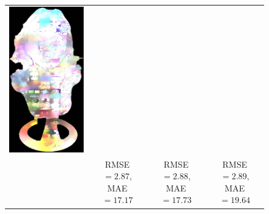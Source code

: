 \begin{figure}[H]
{\begin{tabular}{cccc}
\includegraphics[height=0.25\linewidth]{figures/result/comp_fusion_love_albedo.pdf} \\
& {\small RMSE $= 2.87$, MAE $=17.17$} & {\small RMSE $= 2.88$, MAE $=17.73$} & {\small RMSE $=2.89$, MAE $=19.64$} \\


\end{tabular}}
\end{figure}
